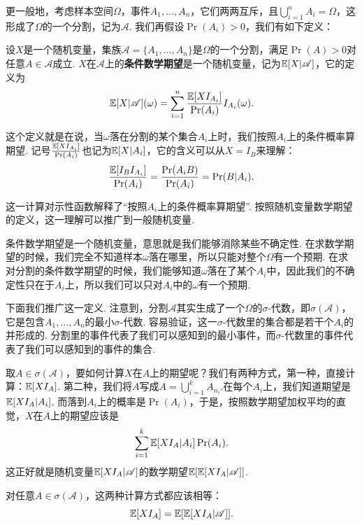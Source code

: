 更一般地，考虑样本空间$\Omega$，事件$A_1,\dots,A_n$，它们两两互斥，且$\bigcup_{i=1}^n A_i=\Omega$，这形成了$\Omega$的一个分割，记为$\mathscr{A}$. 我们再假设$\Pr(A_i)>0$，我们有如下定义：

\begin{definition}[基于分割的条件数学期望]\label{definition:conditional-expectation}
设$X$是一个随机变量，集族$\mathscr{A}=\{A_1,\dots,A_n\}$是$\Omega$的一个分割，满足$\Pr(A)>0$对任意$A\in\mathscr{A}$成立. $X$在$\mathscr{A}$上的\textbf{条件数学期望}是一个随机变量，记为$\mathbb{E}[X|\mathscr{A}]$，它的定义为
\[\mathbb{E}[X|\mathscr{A}](\omega)=\sum_{i=1}^n \frac{\mathbb{E}[XI_{A_i}]}{\Pr(A_i)}I_{A_i}(\omega).\]
\end{definition}
这个定义就是在说，当$\omega$落在分割的某个集合$A_i$上时，我们按照$A_i$上的条件概率算期望. 记号$\frac{\mathbb{E}[XI_{A_i}]}{\Pr(A_i)}$也记为$\mathbb{E}[X|A_i]$，它的含义可以从$X=I_B$来理解：
\[\frac{\mathbb{E}[I_{B}I_{A_i}]}{\Pr(A_i)}=\frac{\Pr(A_iB)}{\Pr(A_i)}=\Pr(B|A_i).\]

这一计算对示性函数解释了“按照$A_i$上的条件概率算期望”. 按照随机变量数学期望的定义，这一理解可以推广到一般随机变量.  

条件数学期望是一个随机变量，意思就是我们能够消除某些不确定性. 在求数学期望的时候，我们完全不知道样本$\omega$落在哪里，所以只能对整个$\Omega$有一个预期. 在求对分割的条件数学期望的时候，我们能够知道$\omega$落在了某个$A_i$中，因此我们的不确定性只在于$A_i$上，所以我们可以只对$A_i$中的$\omega$有一个预期. 

下面我们推广这一定义. 注意到，分割$\mathscr{A}$其实生成了一个$\Omega$的$\sigma$-代数，即$\sigma(\mathscr{A})$，它是包含$A_1,\dots,A_n$的最小$\sigma$-代数. 容易验证，这一$\sigma$-代数里的集合都是若干个$A_i$的并形成的. 分割里的事件代表了我们可以感知到的最小事件，而$\sigma$-代数里的事件代表了我们可以感知到的事件的集合. 

取$A\in\sigma(\mathscr{A})$，要如何计算$X$在$A$上的期望呢？我们有两种方式，第一种，直接计算：$\mathbb{E}[XI_A]$. 第二种，我们将$A$写成$A=\bigcup_{i=1}^k A_{n_i}$.在每个$A_i$上，我们知道期望是$\mathbb{E}[XI_A|A_i]$. 而落到$A_i$上的概率是$\Pr(A_i)$，于是，按照数学期望加权平均的直觉，$X$在$A$上的期望应该是
\[\sum_{i=1}^k \mathbb{E}[XI_A|A_i]\Pr(A_i).\]
这正好就是随机变量$\mathbb{E}[XI_A|\mathscr{A}]$的数学期望$\mathbb{E}[\mathbb{E}[XI_A|\mathscr{A}]]$.

对任意$A\in\sigma(\mathscr{A})$，这两种计算方式都应该相等：
\begin{equation}
    \mathbb{E}[XI_A]=\mathbb{E}[\mathbb{E}[XI_A|\mathscr{A}]].\label{eq:conditional-expectation}
\end{equation}

